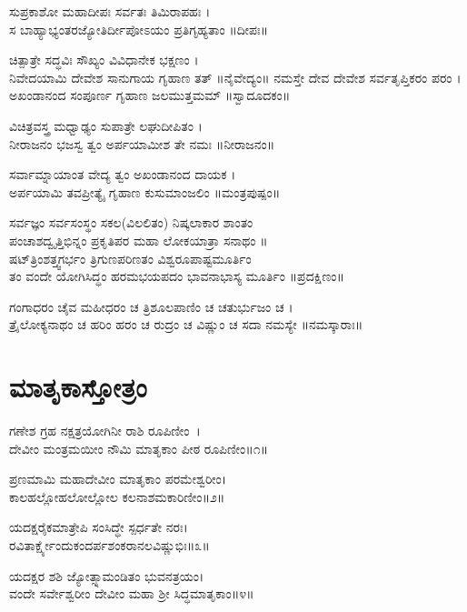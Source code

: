 ಸುಪ್ರಕಾಶೋ ಮಹಾದೀಪಃ ಸರ್ವತಃ ತಿಮಿರಾಪಹಃ ।\\
ಸ ಬಾಹ್ಯಾಭ್ಯಂತರಜ್ಯೋತಿರ್ದೀಪೋಽಯಂ ಪ್ರತಿಗೃಹ್ಯತಾಂ ॥ದೀಪಃ॥

ಚಿತ್ಪಾತ್ರೇ ಸದ್ಧವಿಃ ಸೌಖ್ಯಂ ವಿವಿಧಾನೇಕ ಭಕ್ಷಣಂ ।\\
ನಿವೇದಯಾಮಿ ದೇವೇಶ ಸಾನುಗಾಯ ಗೃಹಾಣ ತತ್ ॥ನೈವೇದ್ಯಂ॥
\newpage
ನಮಸ್ತೇ ದೇವ ದೇವೇಶ ಸರ್ವತೃಪ್ತಿಕರಂ ಪರಂ ।\\
ಅಖಂಡಾನಂದ ಸಂಪೂರ್ಣ ಗೃಹಾಣ ಜಲಮುತ್ತಮಮ್ ॥ಸ್ವಾದೂದಕಂ॥

ವಿಚಿತ್ರವಸ್ತ್ರ ಮಧ್ವಾಢ್ಯಂ ಸುಪಾತ್ರೇ ಲಘುದೀಪಿತಂ ।\\
ನೀರಾಜನಂ ಭಜಸ್ವ ತ್ವಂ ಅರ್ಪಯಾಮೀಶ ತೇ ನಮಃ ॥ನೀರಾಜನಂ॥

ಸರ್ವಾಮ್ನಾಯಾಂತ ವೇದ್ಯ ತ್ವಂ ಅಖಂಡಾನಂದ ದಾಯಕ ।\\
ಅರ್ಪಯಾಮಿ ತವಪ್ರೀತ್ಯೈ ಗೃಹಾಣ ಕುಸುಮಾಂಜಲಿಂ ॥ಮಂತ್ರಪುಷ್ಪಂ॥

ಸರ್ವಜ್ಞಂ ಸರ್ವಸಂಸ್ಥಂ ಸಕಲ(ವಿಲಲಿತಂ) ನಿಷ್ಕಲಾಕಾರ ಶಾಂತಂ \\
ಪಂಚಾಶದ್ವೃತ್ತಿಭಿನ್ನಂ ಪ್ರಕೃತಿಪರ ಮಹಾ ಲೋಕಯಾತ್ರಾ ಸನಾಥಂ ॥\\
ಷಟ್‌ತ್ರಿಂಶತ್ತ್ವಗರ್ಭಂ ತ್ರಿಗುಣಪರಿಣತಂ ವಿಶ್ವರೂಪಾಷ್ಟಮೂರ್ತಿಂ\\
ತಂ ವಂದೇ ಯೋಗಿಸಿದ್ಧಂ ಹರಮಭಯಪದಂ ಭಾವನಾಭಾಸ್ಯ ಮೂರ್ತಿಂ ॥ಪ್ರದಕ್ಷಿಣಂ॥

ಗಂಗಾಧರಂ ಚೈವ ಮಹೀಧರಂ ಚ ತ್ರಿಶೂಲಪಾಣಿಂ ಚ ಚತುರ್ಭುಜಂ ಚ ।\\
ತ್ರೈಲೋಕ್ಯನಾಥಂ ಚ ಹರಿಂ ಹರಂ ಚ ರುದ್ರಂ ಚ ವಿಷ್ಣುಂ ಚ ಸದಾ ನಮಸ್ಯೇ ॥ನಮಸ್ಕಾರಾಃ॥

\section{ಮಾತೃಕಾಸ್ತೋತ್ರಂ}
ಗಣೇಶ ಗ್ರಹ ನಕ್ಷತ್ರಯೋಗಿನೀ ರಾಶಿ ರೂಪಿಣೀಂ~।\\
ದೇವೀಂ ಮಂತ್ರಮಯೀಂ ನೌಮಿ ಮಾತೃಕಾಂ ಪೀಠ ರೂಪಿಣೀಂ॥೧॥

ಪ್ರಣಮಾಮಿ ಮಹಾದೇವೀಂ ಮಾತೃಕಾಂ ಪರಮೇಶ್ವರೀಂ।\\
ಕಾಲಹಲ್ಲೋಹಲೋಲ್ಲೋಲ ಕಲನಾಶಮಕಾರಿಣೀಂ॥೨॥

ಯದಕ್ಷರೈಕಮಾತ್ರೇಪಿ ಸಂಸಿದ್ಧೇ ಸ್ಪರ್ಧತೇ ನರಃ।\\
ರವಿತಾರ್ಕ್ಷ್ಯೇಂದುಕಂದರ್ಪಶಂಕರಾನಲವಿಷ್ಣುಭಿಃ॥೩॥

ಯದಕ್ಷರ ಶಶಿ ಜ್ಯೋತ್ಸ್ನಾಮಂಡಿತಂ ಭುವನತ್ರಯಂ।\\
ವಂದೇ ಸರ್ವೇಶ್ವರೀಂ ದೇವೀಂ ಮಹಾ ಶ್ರೀ ಸಿದ್ಧಮಾತೃಕಾಂ॥೪॥


